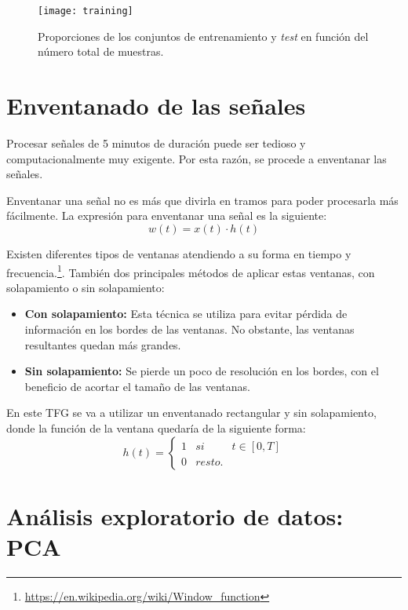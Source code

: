 \begin{figure}[h]
	\centering
	\texttt{[image: training]}
	\caption{Proporciones de los conjuntos de entrenamiento y \textit{test} en función del número total de muestras.}
	\label{fig:training}
\end{figure}

\vspace{1cm}

\section{Enventanado de las señales}

Procesar señales de 5 minutos de duración puede ser tedioso y computacionalmente muy exigente. Por esta razón, se procede a enventanar las señales.\par 

Enventanar una señal no es más que divirla en tramos para poder procesarla más fácilmente. La expresión para enventanar una señal es la siguiente:
\begin{equation}
	w(t) = x(t) · h(t)
\end{equation}

Existen diferentes tipos de ventanas atendiendo a su forma en tiempo y frecuencia.\footnote{\url{https://en.wikipedia.org/wiki/Window_function}}. También dos principales métodos de aplicar estas ventanas, con solapamiento o sin solapamiento:
\begin{itemize}
\item \textbf{Con solapamiento:} Esta técnica se utiliza para evitar pérdida de información en los bordes de las ventanas. No obstante, las ventanas resultantes quedan más grandes.
\item \textbf{Sin solapamiento:} Se pierde un poco de resolución en los bordes, con el beneficio de acortar el tamaño de las ventanas.
\end{itemize} 
En este TFG se va a utilizar un enventanado rectangular y sin solapamiento, donde la función de la ventana quedaría de la siguiente forma:
\begin{equation}
h(t)= \left\{ \begin{array}{lcc}
             1 &   si  & t \in  [0,T] \\
             0 &   resto. 
             \end{array}
   \right.
\end{equation}

\section{Análisis exploratorio de datos: PCA}

